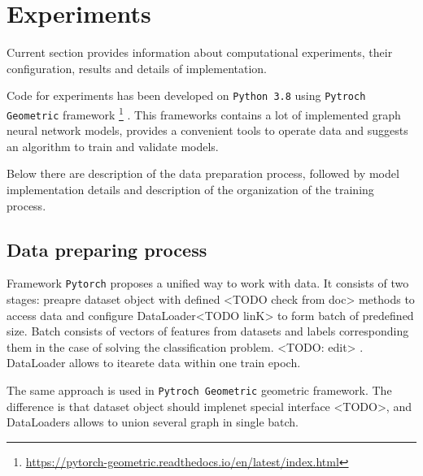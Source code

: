 \section{Experiments}
\label{sec:experiments}


Current section provides information about computational experiments, their configuration, results and details 
of implementation.

Code for experiments has been developed on \texttt{Python 3.8} using \texttt{Pytroch Geometric} framework
\footnote{\url{https://pytorch-geometric.readthedocs.io/en/latest/index.html}}
 \cite{PyG}.
This frameworks contains a lot of implemented graph neural network models, 
provides a convenient tools to operate data and suggests an algorithm to train and validate models.

Below there are description of the data preparation process, followed by model implementation details and description 
of the organization of the training process.


\subsection{Data preparing process}

Framework \texttt{Pytorch} proposes a unified way to work with data.
It consists of two stages:
preapre dataset object with defined <TODO check from doc> methods to access data and configure DataLoader<TODO linK>
to form batch of predefined size. Batch consists of vectors of features from datasets and labels corresponding them
in the case of solving the classification problem. <TODO: edit> . DataLoader allows to 
itearete data within one train epoch.

The same approach is used in \texttt{Pytroch Geometric} geometric framework. The difference is that 
dataset object should implenet special interface <TODO>, and DataLoaders allows to union several graph in single batch.


